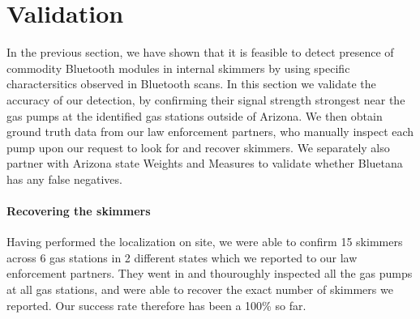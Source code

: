 \section{Validation}
\label{sec:validation}





In the previous section, we have shown that it is feasible to detect presence of commodity Bluetooth modules in internal skimmers by using specific charactersitics observed in Bluetooth scans. In this section we validate the accuracy of our detection, by confirming their signal strength strongest near the gas pumps at the identified gas stations outside of Arizona. We then obtain ground truth data from our law enforcement partners, who manually inspect each pump upon our request to look for and recover skimmers. We separately also partner with Arizona state Weights and Measures to validate whether Bluetana has any false negatives.

\paragraph{Recovering the skimmers}
Having performed the localization on site, we were able to confirm 15 skimmers across 6 gas stations in 2 different states which we reported to our law enforcement partners. They went in and thouroughly inspected all the gas pumps at all gas stations, and were able to recover the exact number of skimmers we reported. Our success rate therefore has been a 100\% so far.

